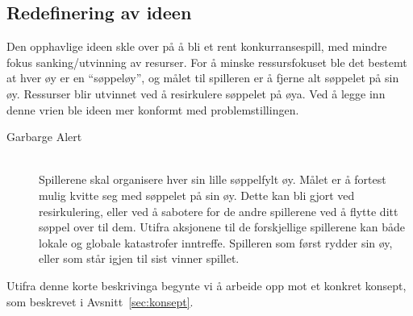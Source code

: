 \subsection{Redefinering av ideen}
Den opphavlige ideen skle over på å bli et rent konkurransespill, med
mindre fokus sanking/utvinning av resurser. For å minske ressursfokuset
ble det bestemt at hver øy er en ``søppeløy'', og målet til spilleren er
å fjerne alt søppelet på sin øy.  Ressurser blir utvinnet ved å
resirkulere søppelet på øya. Ved å legge inn denne vrien ble ideen mer
konformt med problemstillingen. 
\begin{description}
\item[Garbarge Alert] \hfill\\
Spillerene skal organisere hver sin lille søppelfylt øy. Målet er å
fortest mulig kvitte seg med søppelet på sin øy. Dette kan bli gjort ved
resirkulering, eller ved å sabotere for de andre spillerene ved å flytte
ditt søppel over til dem. Utifra aksjonene til de forskjellige
spillerene kan både lokale og globale katastrofer inntreffe. Spilleren
som først rydder sin øy, eller som står igjen til sist vinner spillet.
\end{description}
Utifra denne korte beskrivinga begynte vi å arbeide opp mot et konkret
konsept, som beskrevet i Avsnitt~\ref{sec:konsept}.
